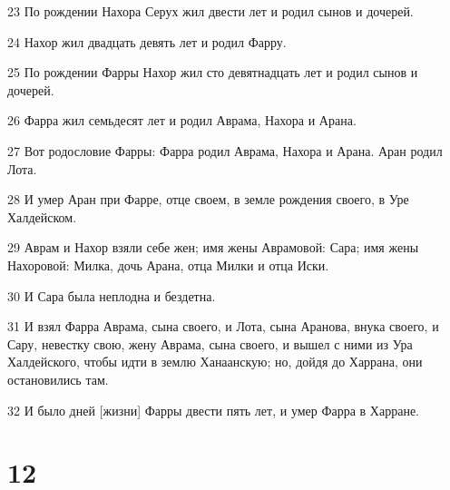 \par 23 По рождении Нахора Серух жил двести лет и родил сынов и дочерей.
\par 24 Нахор жил двадцать девять лет и родил Фарру.
\par 25 По рождении Фарры Нахор жил сто девятнадцать лет и родил сынов и дочерей.
\par 26 Фарра жил семьдесят лет и родил Аврама, Нахора и Арана.
\par 27 Вот родословие Фарры: Фарра родил Аврама, Нахора и Арана. Аран родил Лота.
\par 28 И умер Аран при Фарре, отце своем, в земле рождения своего, в Уре Халдейском.
\par 29 Аврам и Нахор взяли себе жен; имя жены Аврамовой: Сара; имя жены Нахоровой: Милка, дочь Арана, отца Милки и отца Иски.
\par 30 И Сара была неплодна и бездетна.
\par 31 И взял Фарра Аврама, сына своего, и Лота, сына Аранова, внука своего, и Сару, невестку свою, жену Аврама, сына своего, и вышел с ними из Ура Халдейского, чтобы идти в землю Ханаанскую; но, дойдя до Харрана, они остановились там.
\par 32 И было дней [жизни] Фарры двести пять лет, и умер Фарра в Харране.

\chapter{12}

